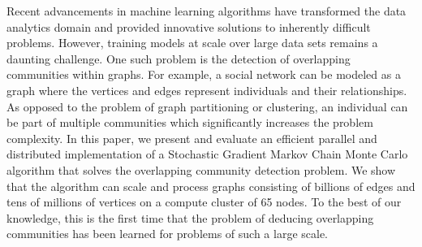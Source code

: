 %
Recent advancements in machine learning algorithms have transformed the data
analytics domain and provided innovative solutions to inherently difficult
problems. However, training models at scale over large data sets remains a
daunting challenge. One such problem is the detection of overlapping
communities within graphs. For example, a social network can be modeled as a
graph where the vertices and edges represent individuals and their
relationships. As opposed to the problem of graph partitioning or clustering, an
individual can be part of multiple communities which significantly increases
the problem complexity.
In this paper, we present and evaluate an efficient parallel and
distributed implementation of a Stochastic Gradient Markov Chain Monte Carlo
algorithm that solves the overlapping community detection problem. We show that
the algorithm can scale and process graphs consisting of billions of edges and
tens of millions of vertices on a compute cluster of 65 nodes. To the best of
our knowledge, this is the first time that the problem of deducing overlapping
communities has been learned for problems of such a large scale.

